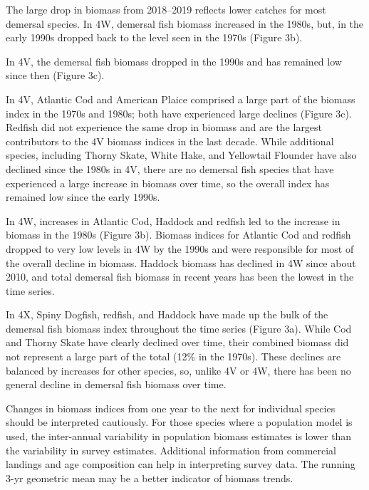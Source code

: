 \documentclass[11pt]{book}
\begin{document}
The large drop in biomass from 2018--2019 reflects lower catches for most demersal species. In 4W, demersal fish biomass increased in the 1980s, but, in the early 1990s dropped back to the level seen in the 1970s (Figure 3b).

In 4V, the demersal fish biomass dropped in the 1990s and has remained low since then (Figure 3c).

In 4V, Atlantic Cod and American Plaice comprised a large part of the biomass index in the 1970s and 1980s; both have experienced large declines (Figure 3c). Redfish did not experience the same drop in biomass and are the largest contributors to the 4V biomass indices in the last decade. While additional species, including Thorny Skate, White Hake, and Yellowtail Flounder have also declined since the 1980s in 4V, there are no demersal fish species that have experienced a large increase in biomass over time, so the overall index has remained low since the early 1990s.

In 4W, increases in Atlantic Cod, Haddock and redfish led to the increase in biomass in the 1980s (Figure 3b). Biomass indices for Atlantic Cod and redfish dropped to very low levels in 4W by the 1990s and were responsible for most of the overall decline in biomass. Haddock biomass has declined in 4W since about 2010, and total demersal fish biomass in recent years has been the lowest in the time series.

In 4X, Spiny Dogfish, redfish, and Haddock have made up the bulk of the demersal fish biomass index throughout the time series (Figure 3a). While Cod and Thorny Skate have clearly declined over time, their combined biomass did not represent a large part of the total (12\% in the 1970s). These declines are balanced by increases for other species, so, unlike 4V or 4W, there has been no general decline in demersal fish biomass over time.

Changes in biomass indices from one year to the next for individual species should be interpreted cautiously. For those species where a population model is used, the inter-annual variability in population biomass estimates is lower than the variability in survey estimates. Additional information from commercial landings and age composition can help in interpreting survey data. The running 3-yr geometric mean may be a better indicator of biomass trends.
\end{document}
